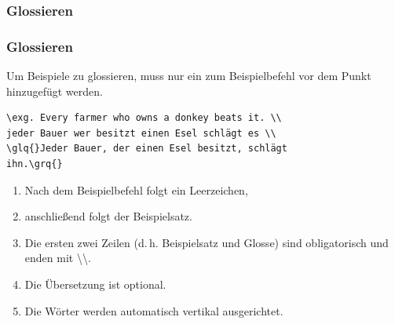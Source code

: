 \subsubsection{Glossieren}
\begin{frame}[fragile]

\frametitle{Glossieren}

Um Beispiele zu glossieren, muss nur ein \textbf{} zum Beispielbefehl vor dem Punkt hinzugefügt werden.

\begin{lstlisting}
\exg. Every farmer who owns a donkey beats it. \\
jeder Bauer wer besitzt einen Esel schlägt es \\
\glq{}Jeder Bauer, der einen Esel besitzt, schlägt 
ihn.\grq{}
\end{lstlisting}


\begin{enumerate}
	\item Nach dem Beispielbefehl  folgt ein Leerzeichen,
	
	\item anschließend folgt der Beispielsatz. 
	
	\item Die ersten zwei Zeilen (d.\,h. Beispielsatz und Glosse) sind obligatorisch und enden mit \textbackslash\textbackslash .
	
	\item Die Übersetzung ist optional. 
	
	\item Die Wörter werden automatisch vertikal ausgerichtet.
\end{enumerate}

\end{frame}


